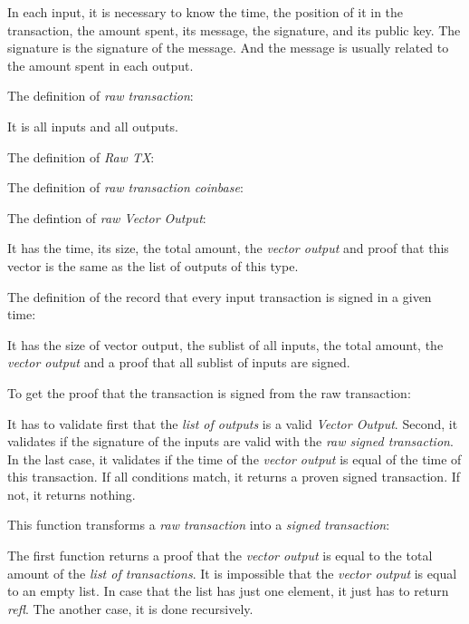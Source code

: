 
In each input, it is necessary to know the time, the position of it in the transaction,
the amount spent, its message, the signature, and its public key.
The signature is the signature of the message.
And the message is usually related to the amount spent in each output.

The definition of \emph{raw transaction}:


It is all inputs and all outputs.

The definition of \emph{Raw TX}:


The definition of \emph{raw transaction coinbase}:


The defintion of \emph{raw Vector Output}: 


It has the time, its size, the total amount, the \emph{vector output}
and proof that this vector is the same as the list of outputs of this type.

The definition of the record that every input transaction is signed in a given time:


It has the size of vector output, the sublist of all inputs, the total amount,
the \emph{vector output} and a proof that all sublist of inputs are signed.

To get the proof that the transaction is signed from the raw transaction:


It has to validate first that the \emph{list of outputs} is a valid \emph{Vector Output}.
Second, it validates if the signature of the inputs are valid with the
\emph{raw signed transaction}.
In the last case, it validates if the time of the \emph{vector output} is equal
of the time of this transaction.
If all conditions match, it returns a proven signed transaction.
If not, it returns nothing.

This function transforms a \emph{raw transaction} into a \emph{signed transaction}:


The first function returns a proof that the \emph{vector output} is equal to the total amount of
the \emph{list of transactions}.
It is impossible that the \emph{vector output} is equal to an empty list.
In case that the list has just one element, it just has to return \emph{refl}.
The another case, it is done recursively.

